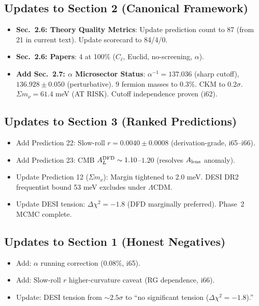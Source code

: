 \documentclass[11pt,a4paper]{article}
\begin{document}
\subsection{Updates to Section 2 (Canonical Framework)}

\begin{itemize}
\item \textbf{Sec.\ 2.6: Theory Quality Metrics}: Update prediction count to 87 (from 21 in current text). Update scorecard to 84/4/0.
\item \textbf{Sec.\ 2.6: Papers}: 4 at 100\% ($C_\ell$, Euclid, no-screening, $\alpha$).
\item \textbf{Add Sec.\ 2.7: $\alpha$ Microsector Status}: $\alpha^{-1} = 137.036$ (sharp cutoff), $136.928 \pm 0.050$ (perturbative). 9 fermion masses to 0.3\%. CKM to $0.2\sigma$. $\Sigma m_\nu = 61.4$ meV (AT RISK). Cutoff independence proven (i62).
\end{itemize}

\subsection{Updates to Section 3 (Ranked Predictions)}

\begin{itemize}
\item Add Prediction 22: Slow-roll $r = 0.0040 \pm 0.0008$ (derivation-grade, i65--i66).
\item Add Prediction 23: CMB $A_L^{\rm DFD} \sim 1.10$--$1.20$ (resolves $A_{\rm lens}$ anomaly).
\item Update Prediction 12 ($\Sigma m_\nu$): Margin tightened to 2.0 meV. DESI DR2 frequentist bound 53 meV excludes under $\Lambda$CDM.
\item Update DESI tension: $\Delta\chi^2 = -1.8$ (DFD marginally preferred). Phase~2 MCMC complete.
\end{itemize}

\subsection{Updates to Section 1 (Honest Negatives)}

\begin{itemize}
\item Add: $\alpha$ running correction (0.08\%, i65).
\item Add: Slow-roll $r$ higher-curvature caveat (RG dependence, i66).
\item Update: DESI tension from $\sim 2.5\sigma$ to ``no significant tension ($\Delta\chi^2 = -1.8$).''
\end{itemize}
\end{document}
